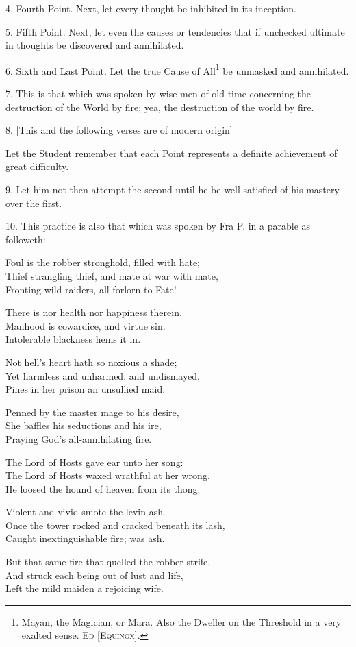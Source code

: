 4. Fourth Point. Next, let every thought be inhibited in its inception.

5. Fifth Point. Next, let even the causes or tendencies that if unchecked ultimate in thoughts be discovered and annihilated.

6. Sixth and Last Point. Let the true Cause of All\footnote{Mayan, the Magician, or Mara. Also the Dweller on the Threshold in a very exalted sense. \textsc{Ed [Equinox]}.} be unmasked and annihilated.

7. This is that which was spoken by wise men of old time concerning the destruction of the World by fire; yea, the destruction of the world by fire.

8. [This and the following verses are of modern origin]

Let the Student remember that each Point represents a definite achievement of great difficulty.

9. Let him not then attempt the second until he be well satisfied of his mastery over the first.

10. This practice is also that which was spoken by Fra P. in a parable as followeth: \begin{tightverse}
 Foul is the robber stronghold, filled with hate; \\
Thief strangling thief, and mate at war with mate, \\
Fronting wild raiders, all forlorn to Fate!

There is nor health nor happiness therein. \\
Manhood is cowardice, and virtue sin. \\
Intolerable blackness hems it in.

Not hell’s heart hath so noxious a shade; \\
Yet harmless and unharmed, and undismayed, \\
Pines in her prison an unsullied maid.

Penned by the master mage to his desire, \\
She baffles his seductions and his ire, \\
Praying God’s all-annihilating fire.

The Lord of Hosts gave ear unto her song: \\
The Lord of Hosts waxed wrathful at her wrong. \\
He loosed the hound of heaven from its thong.

Violent and vivid smote the levin ash. \\
Once the tower rocked and cracked beneath its lash, \\
Caught inextinguishable fire; was ash.

But that same fire that quelled the robber strife, \\
And struck each being out of lust and life, \\
Left the mild maiden a rejoicing wife.
\end{tightverse}

